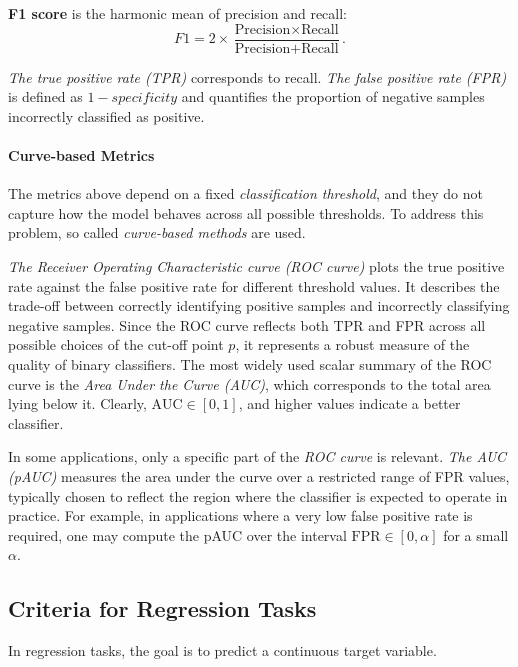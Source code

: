 \textbf{F1 score} is the harmonic mean of precision and recall:
\begin{equation*}
    F1 = 2 \times \frac{\text{Precision} \times \text{Recall}}{\text{Precision} + \text{Recall}}.
\end{equation*}


\textit{The true positive rate (TPR)} corresponds to recall. \textit{The false positive rate (FPR)} is defined as $1 - \textit{specificity}$ and quantifies the proportion of negative samples incorrectly classified as positive.

\paragraph{Curve-based Metrics \\}
The metrics above depend on a fixed \emph{classification threshold}, and they do not capture how the model behaves across all possible thresholds. To address this problem, so called \emph{curve-based methods} are used.

\textit{The Receiver Operating Characteristic curve (ROC curve)} plots the true positive rate against the false positive rate for different threshold values. It describes the trade-off between correctly identifying positive samples and incorrectly classifying negative samples. Since the ROC curve reflects both TPR and FPR across all possible choices of the cut-off point \(p\), it represents a robust measure of the quality of binary classifiers. The most widely used scalar summary of the ROC curve is the \textit{Area Under the Curve (AUC)}, which corresponds to the total area lying below it. Clearly, \( \text{AUC} \in [0,1] \), and higher values indicate a better classifier.

In some applications, only a specific part of the \emph{ROC curve} is relevant. \emph{The AUC (pAUC)} measures the area under the curve over a restricted range of FPR values, typically chosen to reflect the region where the classifier is expected to operate in practice. For example, in applications where a very low false positive rate is required, one may compute the pAUC over the interval $\mathrm{FPR} \in [0, \alpha]$ for a small $\alpha$.

\subsection{Criteria for Regression Tasks}
\label{sec:criteria-regression-tasks}
In regression tasks, the goal is to predict a continuous target variable. 

